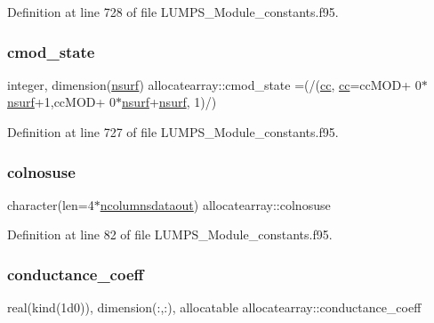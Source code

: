 Definition at line 728 of file L\+U\+M\+P\+S\+\_\+\+Module\+\_\+constants.\+f95.

\mbox{\label{namespaceallocatearray_ada5fca539fc9eb27ca314e4c9994c4dd}} 
\subsubsection{\texorpdfstring{cmod\+\_\+state}{cmod\_state}}
{\footnotesize\ttfamily integer, dimension(\hyperlink{namespaceallocatearray_acd22f92a06f7e9a2a91426b3dc99fdb0}{nsurf}) allocatearray\+::cmod\+\_\+state =(/(\hyperlink{namespaceallocatearray_ac863c81704eb507dee10f5e10741e10c}{cc}, \hyperlink{namespaceallocatearray_ac863c81704eb507dee10f5e10741e10c}{cc}=cc\+M\+OD+ 0$\ast$\hyperlink{namespaceallocatearray_acd22f92a06f7e9a2a91426b3dc99fdb0}{nsurf}+1,cc\+M\+OD+ 0$\ast$\hyperlink{namespaceallocatearray_acd22f92a06f7e9a2a91426b3dc99fdb0}{nsurf}+\hyperlink{namespaceallocatearray_acd22f92a06f7e9a2a91426b3dc99fdb0}{nsurf}, 1)/)}



Definition at line 727 of file L\+U\+M\+P\+S\+\_\+\+Module\+\_\+constants.\+f95.

\mbox{\label{namespaceallocatearray_a8aab8dd16a4f4d4cbc17b0057b356ccb}} 
\subsubsection{\texorpdfstring{colnosuse}{colnosuse}}
{\footnotesize\ttfamily character(len=4$\ast$\hyperlink{namespaceallocatearray_a9408900bed6c87ed095d2c688c1506a0}{ncolumnsdataout}) allocatearray\+::colnosuse}



Definition at line 82 of file L\+U\+M\+P\+S\+\_\+\+Module\+\_\+constants.\+f95.

\mbox{\label{namespaceallocatearray_a71b336f3aa2b306302e6bde6181deffc}} 
\subsubsection{\texorpdfstring{conductance\+\_\+coeff}{conductance\_coeff}}
{\footnotesize\ttfamily real(kind(1d0)), dimension(\+:,\+:), allocatable allocatearray\+::conductance\+\_\+coeff}



